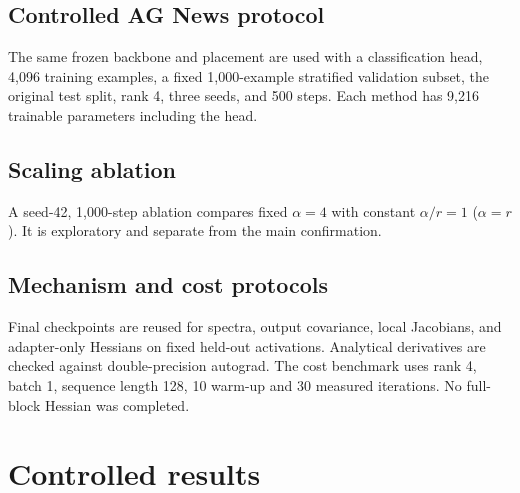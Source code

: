 \documentclass[11pt]{article}
\begin{document}
\subsection{Controlled AG News protocol} The same frozen backbone and placement are used with a classification head, 4,096 training examples, a fixed 1,000-example stratified validation subset, the original test split, rank 4, three seeds, and 500 steps. Each method has 9,216 trainable parameters including the head.

\subsection{Scaling ablation} A seed-42, 1,000-step ablation compares fixed $\alpha=4$ with constant $\alpha/r=1$ ($\alpha=r$). It is exploratory and separate from the main confirmation.

\subsection{Mechanism and cost protocols} Final checkpoints are reused for spectra, output covariance, local Jacobians, and adapter-only Hessians on fixed held-out activations. Analytical derivatives are checked against double-precision autograd. The cost benchmark uses rank 4, batch 1, sequence length 128, 10 warm-up and 30 measured iterations. No full-block Hessian was completed.

\FloatBarrier\section{Controlled results}
\end{document}
